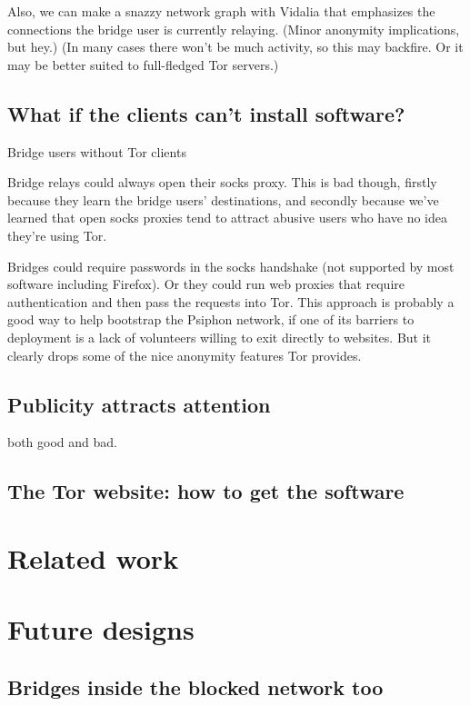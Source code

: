 \documentclass{llncs}
\begin{document}
Also, we can make a snazzy network graph with Vidalia that emphasizes
the connections the bridge user is currently relaying. (Minor anonymity
implications, but hey.) (In many cases there won't be much activity,
so this may backfire. Or it may be better suited to full-fledged Tor
servers.)

\subsection{What if the clients can't install software?}

Bridge users without Tor clients

Bridge relays could always open their socks proxy. This is bad though,
firstly
because they learn the bridge users' destinations, and secondly because
we've learned that open socks proxies tend to attract abusive users who
have no idea they're using Tor.

Bridges could require passwords in the socks handshake (not supported
by most software including Firefox). Or they could run web proxies
that require authentication and then pass the requests into Tor. This
approach is probably a good way to help bootstrap the Psiphon network,
if one of its barriers to deployment is a lack of volunteers willing
to exit directly to websites. But it clearly drops some of the nice
anonymity features Tor provides.

\subsection{Publicity attracts attention}
\label{subsec:publicity}

both good and bad.

\subsection{The Tor website: how to get the software}



\section{Related work}


\section{Future designs}

\subsection{Bridges inside the blocked network too}
\end{document}
